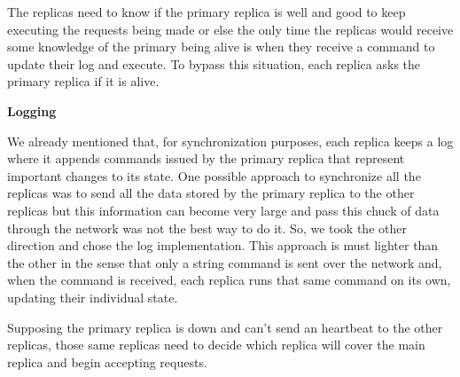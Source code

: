 The replicas need to know if the primary replica is well and good to keep
executing the requests being made or else the only time the replicas would
receive some knowledge of the primary being alive is when they receive a
command to update their log and execute. To bypass this situation, each
replica asks the primary replica if it is alive.

\bigskip
\textbf{Logging}
\smallskip

We already mentioned that, for synchronization purposes, each replica keeps a log
where it appends commands issued by the primary replica that represent important
changes to its state. One possible approach to synchronize all the replicas was to
send all the data stored by the primary replica to the other replicas but this
information can become very large and pass this chuck of data through the network
was not the best way to do it. So, we took the other direction and chose the log
implementation. This approach is must lighter than the other in the sense that only
a string command is sent over the network and, when the command is received, each
replica runs that same command on its own, updating their individual state.

\bigskip

Supposing the primary replica is down and can't send an heartbeat to the other replicas,
those same replicas need to decide which replica will cover the main replica and
begin accepting requests.


